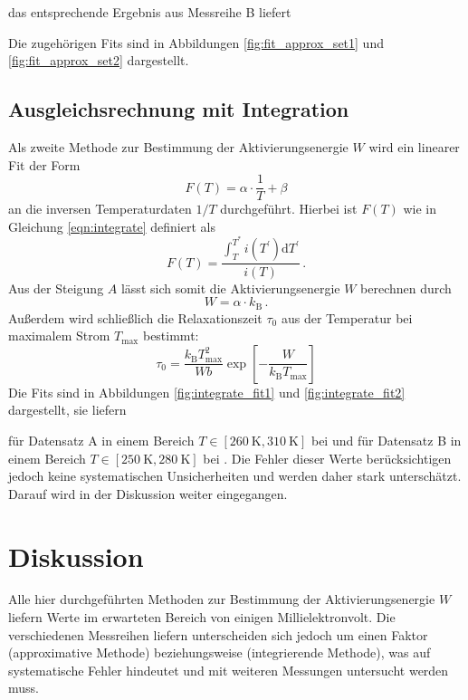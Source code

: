 das entsprechende Ergebnis aus Messreihe B liefert



Die zugehörigen Fits sind in Abbildungen \ref{fig:fit_approx_set1}
und \ref{fig:fit_approx_set2} dargestellt.

\subsection{Ausgleichsrechnung mit Integration}
\label{subsec:integration}
Als zweite Methode zur Bestimmung der Aktivierungsenergie $W$ wird ein
linearer Fit der Form
\begin{equation*}
    F(T) = \alpha\cdot\frac{1}{T} + \beta
\end{equation*}
an die inversen Temperaturdaten $1/T$ durchgeführt.
Hierbei ist $F(T)$ wie in Gleichung \ref{eqn:integrate} definiert als
\begin{equation*}
    F(T) = \frac{\int_T^{T^\ast} i(T^\prime)\mathrm{d}T^\prime}{i(T)}\,.
\end{equation*}
Aus der Steigung $A$ lässt sich somit die Aktivierungsenergie $W$
berechnen durch
\begin{equation*}
    W = \alpha\cdot k_\text{B}\,.
\end{equation*}
Außerdem wird schließlich die Relaxationszeit $\tau_0$ aus der Temperatur
bei maximalem Strom $T_\text{max}$ bestimmt:
\begin{equation}
    \label{eqn:tau0}
    \tau_0 = \frac{k_\text{B}T_\text{max}^2}{Wb}
             \exp\!\left[-\frac{W}{k_\text{B}T_\text{max}} \right]
\end{equation}
Die Fits sind in Abbildungen \ref{fig:integrate_fit1} und \ref{fig:integrate_fit2}
dargestellt, sie liefern



für Datensatz A in einem Bereich $T \in [\SI{260}{\kelvin}, \SI{310}{\kelvin}]$ bei  und
für Datensatz B in einem Bereich $T \in [\SI{250}{\kelvin}, \SI{280}{\kelvin}]$ bei .
Die Fehler dieser Werte berücksichtigen jedoch keine systematischen Unsicherheiten
und werden daher stark unterschätzt. Darauf wird in der Diskussion weiter eingegangen.
\newpage
\section{Diskussion}
\label{sec:diskussion}
Alle hier durchgeführten Methoden zur Bestimmung der Aktivierungsenergie $W$
liefern Werte im erwarteten Bereich von einigen Millielektronvolt.
Die verschiedenen Messreihen liefern unterscheiden sich jedoch um einen Faktor
 (approximative Methode) beziehungsweise
 (integrierende Methode), was
auf systematische Fehler hindeutet und mit weiteren Messungen untersucht
werden muss.

